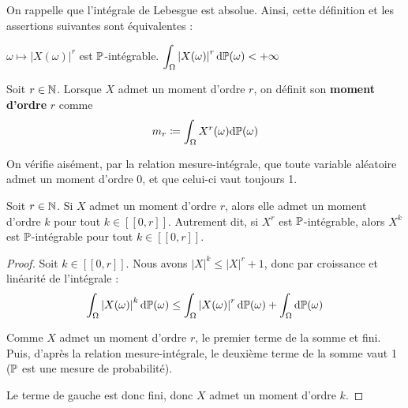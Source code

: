 \documentclass[../integ-proba.tex]{subfiles}
\begin{document}
    \begin{rem}
        On rappelle que l'intégrale de Lebesgue est absolue.
        Ainsi, cette définition et les assertions suivantes sont équivalentes :
        \begin{itemize}
            \itemb $\omega \mapsto \left|X(\omega)\right|^r$ est $\mathbb{P}$-intégrable.
            \itemb $\displaystyle \int_\Omega\left|X(\omega)\right|^r\text{d}\mathbb{P}(\omega) < +\infty$
        \end{itemize}
    \end{rem}

    \begin{defi}
        Soit $r\in\mathbb{N}$.
        Lorsque $X$ admet un moment d'ordre $r$, on définit son \textbf{moment d'ordre } $r$ comme
        \begin{displaymath}
          m_r \coloneqq \int_\Omega X^r(\omega)\text{d}\mathbb{P}(\omega)
        \end{displaymath}
    \end{defi}

    \begin{rem}
        On vérifie aisément, par la relation mesure-intégrale, que toute variable aléatoire admet un moment d'ordre 0, et que celui-ci vaut toujours 1.
    \end{rem}

    \begin{prop}
        \label{prop:moments_cascade}
        Soit $r\in\mathbb{N}$.
        Si $X$ admet un moment d'ordre $r$, alors elle admet un moment d'ordre $k$ pour tout $k\in[\![0,r]\!]$.
        Autrement dit, si $X^r$ est $\mathbb{P}$-intégrable, alors $X^k$ est $\mathbb{P}$-intégrable pour tout $k\in[\![0,r]\!]$.
    \end{prop}

    \begin{proof}
        Soit $k\in[\![0,r]\!]$.
        Nous avons $\left|X\right|^k \leq \left|X\right|^r+1$, donc par croissance et linéarité de l'intégrale :
        \begin{displaymath}
            \int_\Omega \left|X(\omega)\right|^k \text{d}\mathbb{P}(\omega) \leq \int_\Omega \left|X(\omega)\right|^r \text{d}\mathbb{P}(\omega) + \int_\Omega \text{d}\mathbb{P}(\omega)
        \end{displaymath}

        Comme $X$ admet un moment d'ordre $r$, le premier terme de la somme et fini.
        Puis, d'après la relation mesure-intégrale, le deuxième terme de la somme vaut 1 ($\mathbb{P}$ est une mesure de probabilité).

        Le terme de gauche est donc fini, donc $X$ admet un moment d'ordre $k$.
    \end{proof}
\end{document}

